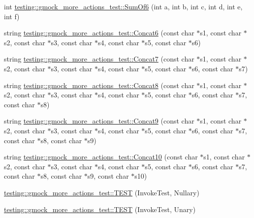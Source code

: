 \begin{DoxyCompactItemize}
int \hyperlink{namespacetesting_1_1gmock__more__actions__test_a139632d344348fdfa25111d4e43f70ba}{testing\+::gmock\+\_\+more\+\_\+actions\+\_\+test\+::\+Sum\+Of6} (int a, int b, int c, int d, int e, int f)
\item 
string \hyperlink{namespacetesting_1_1gmock__more__actions__test_a4de188277a85d007de0aa6e8dc364b75}{testing\+::gmock\+\_\+more\+\_\+actions\+\_\+test\+::\+Concat6} (const char $\ast$s1, const char $\ast$s2, const char $\ast$s3, const char $\ast$s4, const char $\ast$s5, const char $\ast$s6)
\item 
string \hyperlink{namespacetesting_1_1gmock__more__actions__test_a5628f71ebb5ae61a6e56396145a76da4}{testing\+::gmock\+\_\+more\+\_\+actions\+\_\+test\+::\+Concat7} (const char $\ast$s1, const char $\ast$s2, const char $\ast$s3, const char $\ast$s4, const char $\ast$s5, const char $\ast$s6, const char $\ast$s7)
\item 
string \hyperlink{namespacetesting_1_1gmock__more__actions__test_a122e4affe78745eef3dd748e88bd248c}{testing\+::gmock\+\_\+more\+\_\+actions\+\_\+test\+::\+Concat8} (const char $\ast$s1, const char $\ast$s2, const char $\ast$s3, const char $\ast$s4, const char $\ast$s5, const char $\ast$s6, const char $\ast$s7, const char $\ast$s8)
\item 
string \hyperlink{namespacetesting_1_1gmock__more__actions__test_a9f8c8c01bc080a04d798060dad757cf9}{testing\+::gmock\+\_\+more\+\_\+actions\+\_\+test\+::\+Concat9} (const char $\ast$s1, const char $\ast$s2, const char $\ast$s3, const char $\ast$s4, const char $\ast$s5, const char $\ast$s6, const char $\ast$s7, const char $\ast$s8, const char $\ast$s9)
\item 
string \hyperlink{namespacetesting_1_1gmock__more__actions__test_aba6aadf0de090a08bf9e467cdc09ffd8}{testing\+::gmock\+\_\+more\+\_\+actions\+\_\+test\+::\+Concat10} (const char $\ast$s1, const char $\ast$s2, const char $\ast$s3, const char $\ast$s4, const char $\ast$s5, const char $\ast$s6, const char $\ast$s7, const char $\ast$s8, const char $\ast$s9, const char $\ast$s10)
\item 
\hyperlink{namespacetesting_1_1gmock__more__actions__test_a9c5fbd26c6cc6ed31aed5bafb2fa8e5c}{testing\+::gmock\+\_\+more\+\_\+actions\+\_\+test\+::\+T\+E\+ST} (Invoke\+Test, Nullary)
\item 
\hyperlink{namespacetesting_1_1gmock__more__actions__test_a28b57a9f9d38574b7c033988ad528ddd}{testing\+::gmock\+\_\+more\+\_\+actions\+\_\+test\+::\+T\+E\+ST} (Invoke\+Test, Unary)
\item 

\end{DoxyCompactItemize}
